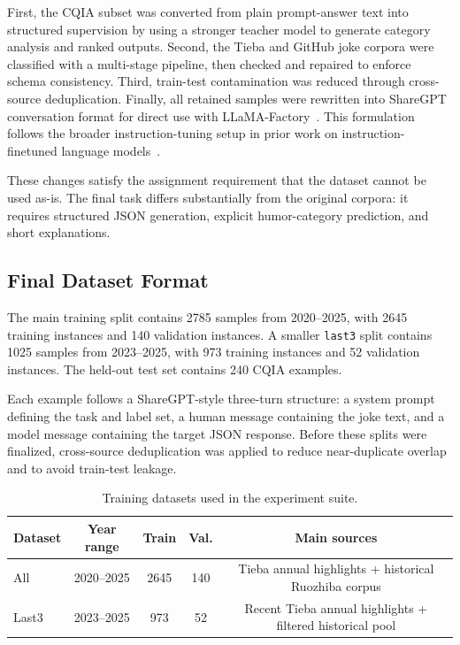 \documentclass{article}
\begin{document}
First, the CQIA subset was converted from plain prompt-answer text into structured supervision by using a stronger teacher model to generate category analysis and ranked outputs. Second, the Tieba and GitHub joke corpora were classified with a multi-stage pipeline, then checked and repaired to enforce schema consistency. Third, train-test contamination was reduced through cross-source deduplication. Finally, all retained samples were rewritten into ShareGPT conversation format for direct use with LLaMA-Factory~\cite{Zheng2024LlamaFactory}. This formulation follows the broader instruction-tuning setup in prior work on instruction-finetuned language models~\cite{Chung2022}.

These changes satisfy the assignment requirement that the dataset cannot be used as-is. The final task differs substantially from the original corpora: it requires structured JSON generation, explicit humor-category prediction, and short explanations.

\subsection{Final Dataset Format}
The main training split contains 2785 samples from 2020--2025, with 2645 training instances and 140 validation instances. A smaller \texttt{last3} split contains 1025 samples from 2023--2025, with 973 training instances and 52 validation instances. The held-out test set contains 240 CQIA examples.

Each example follows a ShareGPT-style three-turn structure: a system prompt defining the task and label set, a human message containing the joke text, and a model message containing the target JSON response. Before these splits were finalized, cross-source deduplication was applied to reduce near-duplicate overlap and to avoid train-test leakage.

\begin{table}[t]
\centering
\small
\caption{Training datasets used in the experiment suite.}
\label{tab:dataset_splits}
\begin{tabular}{lcccc}
\toprule
Dataset & Year range & Train & Val. & Main sources \\
\midrule
All & 2020--2025 & 2645 & 140 & Tieba annual highlights + historical Ruozhiba corpus \\
Last3 & 2023--2025 & 973 & 52 & Recent Tieba annual highlights + filtered historical pool \\
\bottomrule
\end{tabular}
\end{table}
\end{document}
